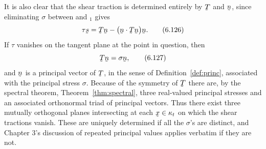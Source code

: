 It is also clear that the shear traction is determined entirely by
$\bT$ and $\bn$, since eliminating $\sigma$ between  and
$_{1}$ gives
\begin{equation}
   \tau\bs=\bT\bn-\big(\ip\bn{\bT\bn}\big)\bn .
   \tag{6.126}\label{eq:6.126}
\end{equation}
If $\tau$ vanishes on the tangent plane at the point in question, then
\begin{equation}
   \bT\bn=\sigma\bn ,
   \tag{6.127}\label{eq:6.127}
\end{equation}
and $\bn$ is a principal vector of $\bT$, in the sense of
Definition~\ref{def:princ}, associated with the principal stress
$\sigma$. Because of the symmetry of $\bT$ there are, by the spectral
theorem, Theorem~\ref{thm:spectral}, three real-valued principal
stresses and an associated orthonormal triad of principal vectors.
Thus there exist three mutually orthogonal planes intersecting at each
$\bx\in\kappa_{t}$ on which the shear tractions vanish. These are
uniquely determined if all the $\sigma$'s are distinct, and Chapter 3's
discussion of repeated principal values applies verbatim if they are
not.

